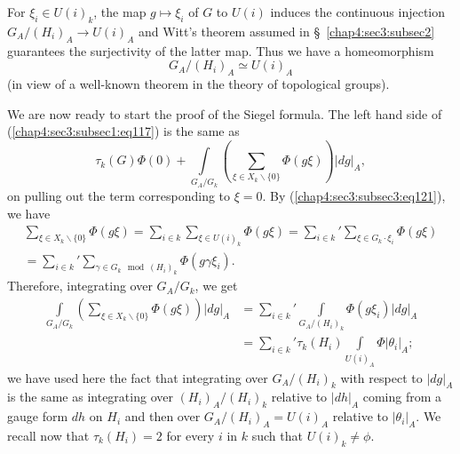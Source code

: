 For $\xi_{i}\in U(i)_{k}$, the map $g\mapsto \xi_{i}$ of $G$ to $U(i)$
induces the continuous injection $G_{A}/(H_{i})_{A}\to U(i)_{A}$ and
Witt's theorem assumed in \S\ \ref{chap4:sec3:subsec2} guarantees the
surjectivity of 
the latter map. Thus we have a homeomorphism
$$
G_{A}/(H_{i})_{A}\simeq U(i)_{A}
$$
(in view of a well-known theorem in the theory of topological groups).

We are now ready to start the proof of the Siegel formula. The left
hand side of (\ref{chap4:sec3:subsec1:eq117}) is the same as
$$
\tau_{k}(G)\Phi(0)+\int\limits_{G_{A}/G_{k}}\left(\sum_{\xi\in
  X_{k}\backslash \{0\}}\Phi(g\xi)\right)|dg|_{A},
$$
on pulling out the term corresponding to $\xi=0$. By
(\ref{chap4:sec3:subsec3:eq121}), we
have
\begin{multline*}
  \sum_{\xi\in X_{k}\backslash \{0\}}\Phi(g\xi)=\sum_{i\in
    k}\sum_{\xi\in U(i)_{k}}\Phi(g\xi)=\sum_{i\in k}{}'\sum_{\xi \in
    G_{k}\cdot \xi_{i}}\Phi(g\xi)\\
  =\sum_{i\in k}{}'\sum_{\gamma\in
    G_{k}\mod (H_{i})_{k}}\Phi(g\gamma\xi_{i}).
\end{multline*}
Therefore, integrating over $G_{A}/G_{k}$, we get 
\begin{align*}
  \int\limits_{G_{A}/G_{k}}\left(\sum_{\xi\in
    X_{k}\backslash\{0\}}\Phi(g\xi)\right)|dg|_{A} &= \sum_{i\in
    k}{}'\int\limits_{G_{A}/(H_{i})_{k}}\Phi(g\xi_{i})|dg|_{A}\\
  & = \sum_{i\in  k}{}'\tau_{k}(H_{i}) \int\limits_{U(i)_{A}} \Phi|
  \theta_{i} |_{A};\tag{122}\label{chap4:sec3:subsec3:eq122}
\end{align*}\pageoriginale
we have used here the fact that integrating over $G_{A}/(H_{i})_{k}$
with respect to $|dg|_{A}$ is the same as integrating over
$(H_{i})_{A}/(H_{i})_{k}$ relative to $|dh|_{A}$ coming from a gauge
form $dh$ on $H_{i}$ and then over $G_{A}/(H_{i})_{A}=U(i)_{A}$
relative to $|\theta_{i}|_{A}$. We recall now that $\tau_{k}(H_{i})=2$
for every $i$ in $k$ such that $U(i)_{k}\neq \phi$.

